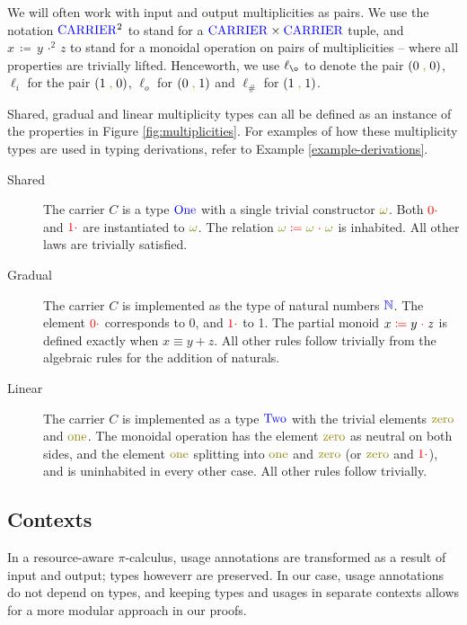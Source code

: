 \documentclass[a4paper,UKenglish,cleveref, autoref, thm-restate,authorcolumns]{lipics-v2019}
\theoremstyle{definition}
\newcommand{\picalc}{$\pi$-calculus}
\newcommand{\type}[1]{\textcolor{blue}{\operatorname{#1}}}
\newcommand{\constr}[1]{\textcolor{olive}{\operatorname{#1}}}
\newcommand{\field}[1]{\textcolor{red}{\operatorname{#1}}}
\newcommand{\comma}{\; \constr{,} \;}
\newcommand{\opsquared}[3]{#1 \, \coloneqq \, #2 \, \cdot^2 \, #3}
\newcommand{\op}[3]{#1 \; \field{\coloneqq} \; #2 \; \field{\cdot} \; #3}
\newcommand{\zero}{\field{0\cdot}}
\newcommand{\one}{\field{1\cdot}}
\newcommand{\li}{\ell_i}
\newcommand{\lo}{\ell_o}
\newcommand{\lz}{\ell_{\o}}
\newcommand{\lio}{\ell_{\#}}
\newcommand{\Carrier}{\type{CARRIER}}
\newcommand{\N}{\type{\mathbb{N}}}
\begin{document}
\begin{note}
  We will often work with input and output multiplicities as pairs.
  We use the notation $\Carrier^2$ to stand for a $\Carrier \times \Carrier$ tuple, and $\opsquared{x}{y}{z}$ to stand for a monoidal operation on pairs of multiplicities -- where all properties are trivially lifted.
  Henceworth, we use $\lz$ to denote the pair $(0 \comma 0)$, $\li$ for the pair $(1 \comma 0)$, $\lo$ for $(0 \comma 1)$ and $\lio$ for $(1 \comma 1)$.
\end{note}

Shared, gradual and linear multiplicity types can all be defined as an instance of the properties in Figure \ref{fig:multiplicities}.
For examples of how these multiplicity types are used in typing derivations, refer to Example \ref{example-derivations}.

\begin{description}
  \item [Shared]
    The carrier $C$ is a type $\type{One}$ with a single trivial constructor $\constr{\omega}$.
    Both $\zero$ and $\one$ are instantiated to $\constr{\omega}$.
    The relation $\op{\constr{\omega}}{\constr{\omega}}{\constr{\omega}}$ is inhabited.
    All other laws are trivially satisfied.
  \item [Gradual]
    The carrier $C$ is implemented as the type of natural numbers $\N$.
    The element $\zero$ corresponds to 0, and $\one$ to 1.
    The partial monoid $\op{x}{y}{z}$ is defined exactly when $x \equiv y + z$.
    All other rules follow trivially from the algebraic rules for the addition of naturals.
  \item [Linear]
    The carrier $C$ is implemented as a type $\type{Two}$ with the trivial elements $\constr{zero}$ and $\constr{one}$.
    The monoidal operation has the element $\constr{zero}$ as neutral on both sides, and the element $\constr{one}$ splitting into $\constr{one}$ and $\constr{zero}$ (or $\constr{zero}$ and $\constr{\one}$), and is uninhabited in every other case.
    All other rules follow trivially.
\end{description}

\subsection{Contexts}
\label{contexts}

In a resource-aware \picalc{}, usage annotations are transformed as a result of input and output; types howeverr are preserved.
In our case, usage annotations do not depend on types, and keeping types and usages in separate contexts allows for a more modular approach in our proofs.
\end{document}
